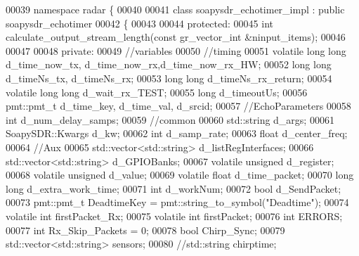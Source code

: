 \begin{DoxyCode}
00039   \textcolor{keyword}{namespace }radar \{
00040 
00041     \textcolor{keyword}{class }soapysdr_echotimer_impl : \textcolor{keyword}{public} soapysdr_echotimer
00042     \{
00043 
00044     \textcolor{keyword}{protected}:
00045       \textcolor{keywordtype}{int} calculate_output_stream_length(\textcolor{keyword}{const} gr\_vector\_int &ninput\_items);
00046 
00047 
00048     \textcolor{keyword}{private}:
00049       \textcolor{comment}{//variables}
00050         \textcolor{comment}{//timing}
00051         \textcolor{keyword}{volatile} \textcolor{keywordtype}{long} \textcolor{keywordtype}{long} d_time_now_tx, d_time_now_rx,d_time_now_rx_HW;
00052         \textcolor{keywordtype}{long} \textcolor{keywordtype}{long} d_timeNs_tx, d_timeNs_rx;
00053         \textcolor{keywordtype}{long} \textcolor{keywordtype}{long} d_timeNs_rx_return;
00054         \textcolor{keyword}{volatile} \textcolor{keywordtype}{long} \textcolor{keywordtype}{long} d_wait_rx_TEST;
00055         \textcolor{keywordtype}{long} d_timeoutUs;
00056         pmt::pmt\_t d_time_key, d_time_val, d_srcid;
00057         \textcolor{comment}{//EchoParameters}
00058         \textcolor{keywordtype}{int} d_num_delay_samps;
00059         \textcolor{comment}{//common}
00060         std::string d_args;
00061         SoapySDR::Kwargs d_kw;
00062         \textcolor{keywordtype}{int} d_samp_rate;
00063         \textcolor{keywordtype}{float} d_center_freq;
00064         \textcolor{comment}{//Aux}
00065         std::vector<std::string> d_listRegInterfaces;
00066         std::vector<std::string> d_GPIOBanks;
00067         \textcolor{keyword}{volatile} \textcolor{keywordtype}{unsigned} d_register;
00068         \textcolor{keyword}{volatile} \textcolor{keywordtype}{unsigned} d_value;
00069         \textcolor{keyword}{volatile} \textcolor{keywordtype}{float} d_time_packet;
00070         \textcolor{keywordtype}{long} \textcolor{keywordtype}{long} d_extra_work_time;
00071         \textcolor{keywordtype}{int} d_workNum;
00072         \textcolor{keywordtype}{bool} d_SendPacket;
00073         pmt::pmt\_t DeadtimeKey = pmt::string\_to\_symbol(\textcolor{stringliteral}{"Deadtime"});
00074         \textcolor{keyword}{volatile} \textcolor{keywordtype}{int} firstPacket_Rx;
00075         \textcolor{keyword}{volatile} \textcolor{keywordtype}{int} firstPacket;
00076         \textcolor{keywordtype}{int} ERRORS;
00077         \textcolor{keywordtype}{int} Rx_Skip_Packets = 0;
00078         \textcolor{keywordtype}{bool} Chirp_Sync;
00079         std::vector<std::string> sensors;
00080         \textcolor{comment}{//std::string chirptime;}

\end{DoxyCode}
